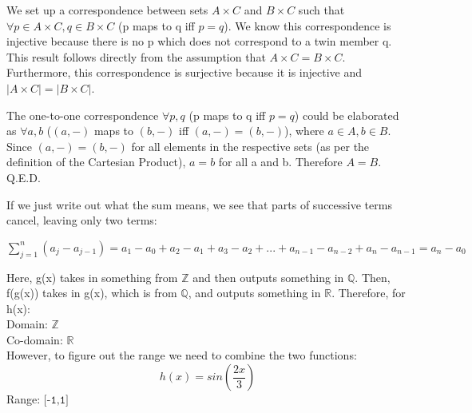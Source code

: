 \documentclass[addpoints]{exam}
\begin{document}
\begin{questions}
\begin{subparts}
	\subpart We set up a correspondence between sets $A \times C$ and $B \times C$ such that $\forall p \in A \times C, q \in B \times C$ (p maps to q iff $p = q$). We know this correspondence is injective because there is no p which does not correspond to a twin member q. This result follows directly from the assumption that $A \times C = B \times C$. Furthermore, this correspondence is surjective because it is injective and $|A \times C| = |B \times C|$. 
	
	The one-to-one correspondence $\forall p,q$ (p maps to q iff $p = q$) could be elaborated as $\forall a,b$ ($(a, -)$ maps to $(b, -)$ iff $(a,-) = (b,-)$), where $a \in A, b \in B$. Since $(a, -) = (b, -)$ for all elements in the respective sets (as per the definition of the Cartesian Product), $a = b$ for all a and b. Therefore $A = B$. Q.E.D.
	
	
	
\end{subparts}

\question


If we just write out what the sum means, we see that parts of successive terms cancel, leaving only two terms: 
\begin{center}
	$\sum_{j = 1}^{n} (a_j - a_{j-1}) = a_1-a_0+a_2-a_1+a_3-a_2+...+a_{n-1}-a_{n-2}+a_n-a_{n-1} = a_n - a_0 $
\end{center}

\question

Here, g(x) takes in something from $\mathbb{Z}$ and then outputs something in $\mathbb{Q}$. Then, f(g(x)) takes in g(x), which is from $\mathbb{Q}$, and outputs something in $\mathbb{R}$. Therefore, for h(x):\\ 
Domain: $\mathbb{Z}$ \\
Co-domain: $\mathbb{R}$ \\
However, to figure out the range we need to combine the two functions: \
\[h(x) = sin(\frac{2x}{3})\]
Range: $\texttt{[-1,1]}$

\question

\end{questions}
\end{document}
